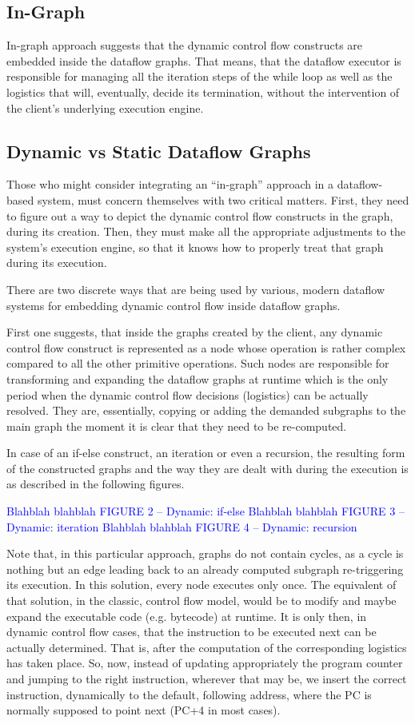 \documentclass[ack,preface]{dithesis}
\begin{document}
    \subsection{In-Graph}
In-graph approach suggests that the dynamic control flow constructs are embedded inside the dataflow graphs. That means, that the dataflow executor is responsible for managing all the iteration steps of the while loop as well as the logistics that will, eventually, decide its termination, without the intervention of the client’s underlying execution engine.

    \subsection{Dynamic vs Static Dataflow Graphs}
Those who might consider integrating an “in-graph” approach in a dataflow-based system, must concern themselves with two critical matters. First, they need to figure out a way to depict the dynamic control flow constructs in the graph, during its creation. Then, they must make all the appropriate adjustments to the system’s execution engine, so that it knows how to properly treat that graph during its execution.

There are two discrete ways that are being used by various, modern dataflow systems for embedding dynamic control flow inside dataflow graphs. 

First one suggests, that inside the graphs created by the client, any dynamic control flow construct is represented as a node whose operation is rather complex compared to all the other primitive operations. Such nodes are responsible for transforming and expanding the dataflow graphs at runtime which is the only period when the dynamic control flow decisions (logistics) can be actually resolved. They are, essentially, copying or adding the demanded subgraphs to the main graph the moment it is clear that they need to be re-computed.

In case of an if-else construct, an iteration or even a recursion, the resulting form of the constructed graphs and the way they are dealt with during the execution is as described in the following figures. 

\textcolor{blue}{Blahblah blahblah
FIGURE 2 – Dynamic: if-else
Blahblah blahblah
FIGURE 3 – Dynamic: iteration
Blahblah blahblah
FIGURE 4 – Dynamic: recursion}


Note that, in this particular approach, graphs do not contain cycles, as a cycle is nothing but an edge leading back to an already computed subgraph re-triggering its execution. In this solution, every node executes only once.
The equivalent of that solution, in the classic, control flow model, would be to modify and maybe expand the executable code (e.g. bytecode) at runtime. It is only then, in dynamic control flow cases, that the instruction to be executed next can be actually determined. That is, after the computation of the corresponding logistics has taken place. So, now, instead of updating appropriately the program counter and jumping to the right instruction, wherever that may be, we insert the correct instruction, dynamically to the default, following address, where the PC is normally supposed to point next (PC+4 in most cases).
\end{document}

